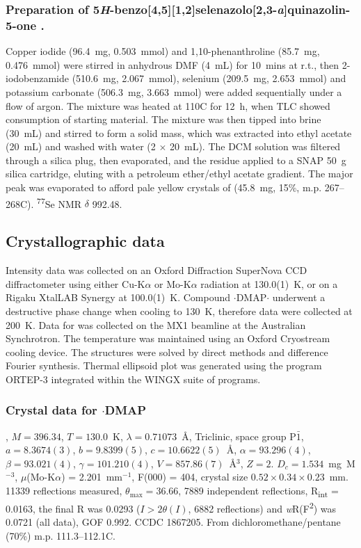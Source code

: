 \begin{refsection}
\subsubsection[Preparation of \refcmpd{tetracycle}.]{Preparation of 5\emph{H}-benzo[4,5][1,2]selenazolo[2,3-\emph{a}]quinazolin-5-one .}

Copper iodide (96.4~mg, 0.503~mmol) and 1,10-phenanthroline (85.7~mg, 0.476~mmol) were stirred in anhydrous DMF (4~mL) for 10~mins at r.t., then 2-iodobenzamide (510.6~mg, 2.067~mmol), selenium (209.5~mg, 2.653~mmol) and potassium carbonate (506.3~mg, 3.663~mmol) were added sequentially under a flow of argon. 
The mixture was heated at 110\degree C for 12~h, when TLC showed consumption of starting material. 
The mixture was then tipped into brine (30~mL) and stirred to form a solid mass, which was extracted into ethyl acetate (20~mL) and washed with water (2 $\times$ 20~mL).
The DCM solution was filtered through a silica plug, then evaporated, and the residue applied to a SNAP 50~g silica cartridge, eluting with a petroleum ether/ethyl acetate gradient. 
The major peak was evaporated to afford pale yellow crystals of  (45.8~mg, 15\%, m.p. 267--268\degree C). \textsuperscript{77}Se NMR $\delta$ 992.48.

\subsection{Crystallographic data}
Intensity data was collected on an Oxford Diffraction SuperNova CCD diffractometer using either Cu-K$\alpha$ or Mo-K$\alpha$ radiation at 130.0(1)~K, or on a Rigaku XtalLAB Synergy at 100.0(1)~K. Compound $\cdot$DMAP$\cdot$ underwent a destructive phase change when cooling to 130~K, therefore data were collected at 200~K. Data for  was collected on the MX1 beamline at the Australian Synchrotron\autocite{Cowieson2015}. The temperature was maintained using an Oxford Cryostream cooling device. The structures were solved by direct methods and difference Fourier synthesis.\autocite{Sheldrick2015} Thermal ellipsoid plot was generated using the program ORTEP-3\autocite{Farrugia1997} integrated within the WINGX\autocite{Farrugia1999} suite of programs.  

\subsubsection{Crystal data for $\cdot$DMAP}
, $M=396.34$, $T=130.0$~K, $\lambda=0.71073$~\AA, Triclinic, space group P$\bar{1}$, $a = 8.3674(3)$, $b = 9.8399(5)$, $c =10.6622(5)$~\AA, $\alpha=93.296(4)$\degree, $\beta=93.021(4)$\degree, $\gamma=101.210(4)$\degree, $V=857.86(7)$~\AA$^{3}$, $Z = 2$.
$D_{c}= 1.534$~mg~M$^{-3}$, $\mu$(Mo-K$\alpha$) = 2.201~mm$^{-1}$, F(000) = 404, crystal size $0.52 \times 0.34 \times 0.23$~mm.
11339 reflections measured, $\theta_{\mathrm{max}}=36.66$\degree, 7889 independent reflections, R\textsubscript{int} = 0.0163, the final R was 0.0293 ($I > 2\theta(I)$, 6882 reflections) and \emph{w}R(F\textsuperscript{2}) was 0.0721 (all data), GOF 0.992. 
CCDC 1867205. 
From dichloromethane/pentane (70\%) m.p. 111.3--112.1\degree C.


\end{refsection}
